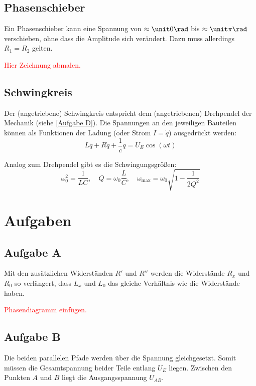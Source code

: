 \documentclass[11pt, ngerman]{article}
\begin{document}
\subsection{Phasenschieber}

Ein Phasenschieber kann eine Spannung von $\approx \unit0\rad$ bis $\approx
\unit\pi\rad$ verschieben, ohne dass die Amplitude sich verändert. Dazu muss
allerdings $R_1 = R_2$ gelten.

\textcolor{red}{Hier Zeichnung abmalen.}

\subsection{Schwingkreis}

Der (angetriebene) Schwingkreis entspricht dem (angetriebenen) Drehpendel der
Mechanik (siehe \ref{Aufgabe D}). Die Spannungen an den jeweiligen Bauteilen
können als Funktionen der Ladung (oder Strom $I=\dot q$) ausgedrückt werden:
\[ L \ddot q + R \dot q + \frac 1c q = U_E \cos(\omega t) \]

Analog zum Drehpendel gibt es die Schwingungsgrößen:
\[
	\omega_0^2 = \frac{1}{LC}
	, \quad
	Q = \omega_0 \frac LC
	, \quad
	\omega_\text{max} = \omega_0 \sqrt{1 - \frac{1}{2 Q^2}}
\]


\section{Aufgaben}

\subsection{Aufgabe A}

Mit den zusätzlichen Widerständen $R'$ und $R''$ werden die Widerstände $R_x$
und $R_0$ so verlängert, dass $L_x$ und $L_0$ das gleiche Verhältnis wie die
Widerstände haben.

\textcolor{red}{Phasendiagramm einfügen.}

\subsection{Aufgabe B}

Die beiden parallelen Pfade werden über die Spannung gleichgesetzt. Somit
müssen die Gesamtspannung beider Teile entlang $U_E$ liegen. Zwischen den
Punkten $A$ und $B$ liegt die Ausgangsspannung $U_{AB}$.
\end{document}

